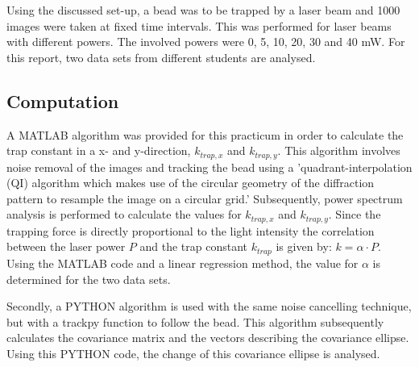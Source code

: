 Using the discussed set-up, a bead was to be trapped by a laser beam and 1000 images were taken at fixed time intervals. This was performed for laser beams with different powers. The involved powers were 0, 5, 10, 20, 30 and 40 mW. For this report, two data sets from different students are analysed.

\subsection{Computation}

A MATLAB algorithm was provided for this practicum in order to calculate the trap constant in a x- and y-direction, $k_{trap,x}$ and $k_{trap,y}$. This algorithm involves noise removal of the images and tracking the bead using a 'quadrant-interpolation (QI) algorithm  which makes use of the circular geometry of the diffraction pattern to resample the image on a circular grid.' \cite{loenhout} Subsequently, power spectrum analysis is performed to calculate the values for $k_{trap,x}$ and $k_{trap,y}$. Since the trapping force is directly proportional to the light intensity the correlation between the laser power $P$ and the trap constant $k_{trap}$ is given by: $k= \alpha \cdot P$. Using the MATLAB code and a linear regression method, the value for $\alpha$ is determined for the two data sets. 

Secondly, a PYTHON algorithm is used with the same noise cancelling technique, but with a trackpy function to follow the bead. This algorithm subsequently calculates the covariance matrix and the vectors describing the covariance ellipse. Using this PYTHON code, the change of this covariance ellipse is analysed.




